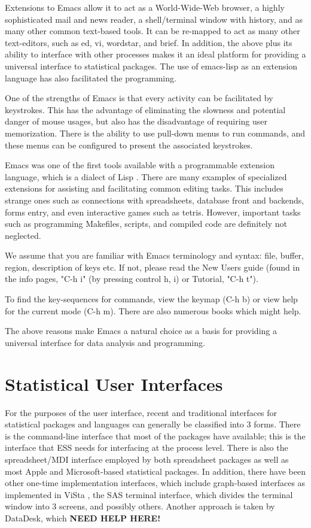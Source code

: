 \documentclass{article}
\begin{document}
Extensions to Emacs allow it to act as a World-Wide-Web browser, a
highly sophisticated mail and news reader, a shell/terminal window
with history, and as many other common text-based tools.  It can be
re-mapped to act as many other text-editors, such as ed, vi, wordstar,
and brief.  In addition, the above plus its ability to interface with
other processes makes it an ideal platform for providing a universal
interface to statistical packages.  The use of emacs-lisp as an
extension language has also facilitated the programming.

One of the strengths of Emacs is that every activity can be
facilitated by keystrokes.  This has the advantage of eliminating the
slowness and potential danger of mouse usages, but also has the
disadvantage of requiring user memorization.  There is the ability to
use pull-down menus to run commands, and these menus can be configured
to present the associated keystrokes.

Emacs was one of the first tools available with a programmable
extension language, which is a dialect of Lisp
\citep{RChassell1999,PGraham:1996}.  There are many examples of
specialized extensions for assisting and facilitating common editing
tasks.  This includes strange ones such as connections with
spreadsheets, database front and backends, forms entry, and even
interactive games such as tetris.  However, important tasks such as
programming Makefiles, scripts, and compiled code are definitely not
neglected.

We assume that you are familiar with Emacs terminology and syntax:
file, buffer, region, description of keys etc.  If not, please read
the New Users guide (found in the info pages, "C-h i" (by pressing
control h, i) or Tutorial, "C-h t").

To find the key-sequences for commands, view the keymap (C-h b) or
view help for the current mode (C-h m).   There are also numerous
books which might help.

The above reasons make Emacs a natural choice as a basis for providing
a universal interface for data analysis and programming.

\section{Statistical User Interfaces}
\label{sec:UI}

For the purposes of the user interface, recent and traditional
interfaces for statistical packages and languages can generally be
classified into 3 forms.  There is the command-line interface that
most of the packages have available; this is the interface that ESS
needs for interfacing at the process level.  There is also the
spreadsheet/MDI interface employed by both spreadsheet packages as
well as most Apple and Microsoft-based statistical packages.  In
addition, there have been other one-time implementation interfaces,
which include graph-based interfaces as implemented in ViSta
\citep{youn:lubi:1995}, the SAS terminal interface, which divides the
terminal window into 3 screens, and possibly others.  Another approach
is taken by DataDesk, which \textbf{NEED HELP HERE!}
\end{document}
